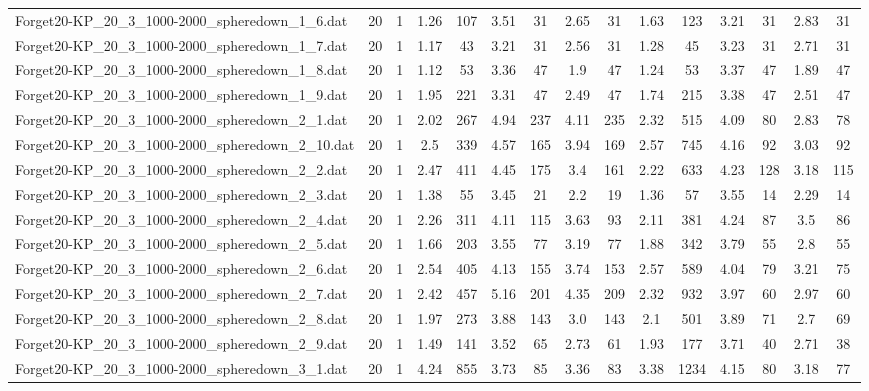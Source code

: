 \begin{table}[!ht]
{\begin{tabular}{lcccccccccccccc}
Forget20-KP\_20\_3\_1000-2000\_spheredown\_1\_6.dat & 20 & 1 & 1.26 & 107 & 3.51 & 31 & 2.65 & 31 & 1.63 & 123 & 3.21 & 31 & 2.83 & 31 \\
Forget20-KP\_20\_3\_1000-2000\_spheredown\_1\_7.dat & 20 & 1 & 1.17 & 43 & 3.21 & 31 & 2.56 & 31 & 1.28 & 45 & 3.23 & 31 & 2.71 & 31 \\
Forget20-KP\_20\_3\_1000-2000\_spheredown\_1\_8.dat & 20 & 1 & 1.12 & 53 & 3.36 & 47 & 1.9 & 47 & 1.24 & 53 & 3.37 & 47 & 1.89 & 47 \\
Forget20-KP\_20\_3\_1000-2000\_spheredown\_1\_9.dat & 20 & 1 & 1.95 & 221 & 3.31 & 47 & 2.49 & 47 & 1.74 & 215 & 3.38 & 47 & 2.51 & 47 \\
Forget20-KP\_20\_3\_1000-2000\_spheredown\_2\_1.dat & 20 & 1 & 2.02 & 267 & 4.94 & 237 & 4.11 & 235 & 2.32 & 515 & 4.09 & 80 & 2.83 & 78 \\
Forget20-KP\_20\_3\_1000-2000\_spheredown\_2\_10.dat & 20 & 1 & 2.5 & 339 & 4.57 & 165 & 3.94 & 169 & 2.57 & 745 & 4.16 & 92 & 3.03 & 92 \\
Forget20-KP\_20\_3\_1000-2000\_spheredown\_2\_2.dat & 20 & 1 & 2.47 & 411 & 4.45 & 175 & 3.4 & 161 & 2.22 & 633 & 4.23 & 128 & 3.18 & 115 \\
Forget20-KP\_20\_3\_1000-2000\_spheredown\_2\_3.dat & 20 & 1 & 1.38 & 55 & 3.45 & 21 & 2.2 & 19 & 1.36 & 57 & 3.55 & 14 & 2.29 & 14 \\
Forget20-KP\_20\_3\_1000-2000\_spheredown\_2\_4.dat & 20 & 1 & 2.26 & 311 & 4.11 & 115 & 3.63 & 93 & 2.11 & 381 & 4.24 & 87 & 3.5 & 86 \\
Forget20-KP\_20\_3\_1000-2000\_spheredown\_2\_5.dat & 20 & 1 & 1.66 & 203 & 3.55 & 77 & 3.19 & 77 & 1.88 & 342 & 3.79 & 55 & 2.8 & 55 \\
Forget20-KP\_20\_3\_1000-2000\_spheredown\_2\_6.dat & 20 & 1 & 2.54 & 405 & 4.13 & 155 & 3.74 & 153 & 2.57 & 589 & 4.04 & 79 & 3.21 & 75 \\
Forget20-KP\_20\_3\_1000-2000\_spheredown\_2\_7.dat & 20 & 1 & 2.42 & 457 & 5.16 & 201 & 4.35 & 209 & 2.32 & 932 & 3.97 & 60 & 2.97 & 60 \\
Forget20-KP\_20\_3\_1000-2000\_spheredown\_2\_8.dat & 20 & 1 & 1.97 & 273 & 3.88 & 143 & 3.0 & 143 & 2.1 & 501 & 3.89 & 71 & 2.7 & 69 \\
Forget20-KP\_20\_3\_1000-2000\_spheredown\_2\_9.dat & 20 & 1 & 1.49 & 141 & 3.52 & 65 & 2.73 & 61 & 1.93 & 177 & 3.71 & 40 & 2.71 & 38 \\
Forget20-KP\_20\_3\_1000-2000\_spheredown\_3\_1.dat & 20 & 1 & 4.24 & 855 & 3.73 & 85 & 3.36 & 83 & 3.38 & 1234 & 4.15 & 80 & 3.18 & 77 \\

\end{tabular}}
\end{table}
